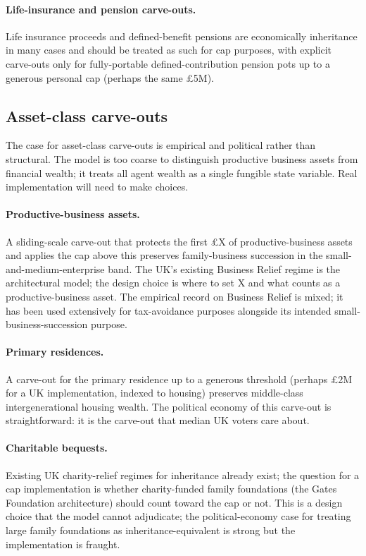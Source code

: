 \documentclass[11pt]{article}
\begin{document}
\paragraph{Life-insurance and pension carve-outs.}  Life insurance
proceeds and defined-benefit pensions are economically inheritance
in many cases and should be treated as such for cap purposes, with
explicit carve-outs only for fully-portable defined-contribution
pension pots up to a generous personal cap (perhaps the same
\pounds 5M).

\subsection{Asset-class carve-outs}

The case for asset-class carve-outs is empirical and political
rather than structural.  The model is too coarse to distinguish
productive business assets from financial wealth; it treats all
agent wealth as a single fungible state variable.  Real
implementation will need to make choices.

\paragraph{Productive-business assets.}  A sliding-scale carve-out
that protects the first \pounds X of productive-business assets and applies
the cap above this preserves family-business succession in the
small-and-medium-enterprise band.  The UK's existing Business
Relief regime is the architectural model; the design choice is
where to set X and what counts as a productive-business asset.
The empirical record on Business Relief is mixed; it has been used
extensively for tax-avoidance purposes alongside its intended
small-business-succession purpose.

\paragraph{Primary residences.}  A carve-out for the primary
residence up to a generous threshold (perhaps \pounds 2M for a UK
implementation, indexed to housing) preserves middle-class
intergenerational housing wealth.  The political economy of this
carve-out is straightforward: it is the carve-out that median UK
voters care about.

\paragraph{Charitable bequests.}  Existing UK charity-relief
regimes for inheritance already exist; the question for a cap
implementation is whether charity-funded family foundations
(the Gates Foundation architecture) should count toward the cap
or not.  This is a design choice that the model cannot adjudicate;
the political-economy case for treating large family foundations
as inheritance-equivalent is strong but the implementation is
fraught.
\end{document}
